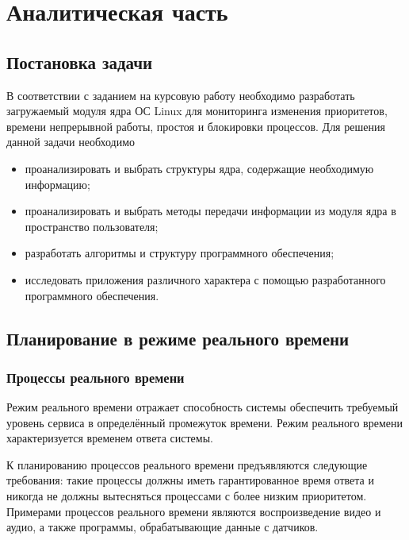 \chapter{Аналитическая часть}

\section{Постановка задачи}

В соответствии с заданием на курсовую работу необходимо разработать загружаемый модуля ядра ОС Linux для мониторинга изменения приоритетов, времени непрерывной работы, простоя и блокировки процессов. Для решения данной задачи необходимо

\begin{itemize}[label*=---]
	\item проанализировать и выбрать структуры ядра, содержащие необходимую информацию;
	\item проанализировать и выбрать методы передачи информации из модуля ядра в пространство пользователя;
	\item разработать алгоритмы и структуру программного обеспечения;
	\item исследовать приложения различного характера с помощью разработанного программного обеспечения.
\end{itemize}

\section{Планирование в режиме реального времени}

\subsection{Процессы реального времени}

Режим реального времени отражает способность системы обеспечить требуемый уровень сервиса в определённый промежуток времени.
Режим реального времени характеризуется временем ответа системы.


К планированию процессов реального времени предъявляются следующие требования: такие процессы должны иметь гарантированное время ответа и никогда не должны вытесняться процессами с более низким приоритетом. Примерами процессов реального времени являются воспроизведение видео и аудио, а также программы, обрабатывающие данные с датчиков. \cite{understanding}

